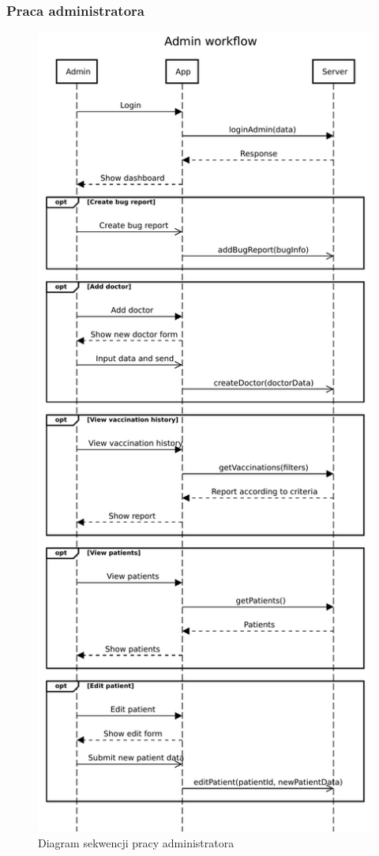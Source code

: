 \documentclass[a4paper,12pt,polish]{article}
\begin{document}
\newpage

\subsubsection{Praca administratora}

\begin{figure}[!htbp]
    \centering
    \includegraphics[width=\textwidth,height=0.8\textheight,keepaspectratio]{Admin_workflow.pdf} 
    \caption{Diagram sekwencji pracy administratora
    \label{fig:diagram-uml}}
\end{figure}
\end{document}
